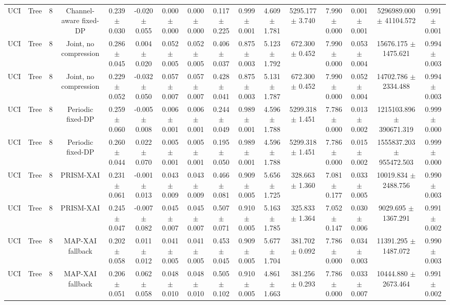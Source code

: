 \begin{tabular}{lccccccccccccccc}
UCI & Tree & 8 & Channel-aware fixed-DP & 0.239 $\pm$ 0.030 & -0.020 $\pm$ 0.055 & 0.000 $\pm$ 0.000 & 0.000 $\pm$ 0.000 & 0.117 $\pm$ 0.225 & 0.999 $\pm$ 0.001 & 4.609 $\pm$ 1.781 & 5295.177 $\pm$ 3.740 & 7.990 $\pm$ 0.000 & 0.001 $\pm$ 0.001 & 5296989.000 $\pm$ 41104.572 & 0.991 $\pm$ 0.001 \\
UCI & Tree & 8 & Joint, no compression & 0.286 $\pm$ 0.045 & 0.004 $\pm$ 0.020 & 0.052 $\pm$ 0.005 & 0.052 $\pm$ 0.005 & 0.406 $\pm$ 0.037 & 0.875 $\pm$ 0.003 & 5.123 $\pm$ 1.792 & 672.300 $\pm$ 0.452 & 7.990 $\pm$ 0.000 & 0.053 $\pm$ 0.004 & 15676.175 $\pm$ 1475.621 & 0.994 $\pm$ 0.003 \\
UCI & Tree & 8 & Joint, no compression & 0.229 $\pm$ 0.052 & -0.032 $\pm$ 0.050 & 0.057 $\pm$ 0.007 & 0.057 $\pm$ 0.007 & 0.428 $\pm$ 0.041 & 0.875 $\pm$ 0.003 & 5.131 $\pm$ 1.787 & 672.300 $\pm$ 0.452 & 7.990 $\pm$ 0.000 & 0.052 $\pm$ 0.004 & 14702.786 $\pm$ 2334.488 & 0.994 $\pm$ 0.003 \\
UCI & Tree & 8 & Periodic fixed-DP & 0.259 $\pm$ 0.060 & -0.005 $\pm$ 0.008 & 0.006 $\pm$ 0.001 & 0.006 $\pm$ 0.001 & 0.244 $\pm$ 0.049 & 0.989 $\pm$ 0.001 & 4.596 $\pm$ 1.788 & 5299.318 $\pm$ 1.451 & 7.786 $\pm$ 0.000 & 0.013 $\pm$ 0.002 & 1215103.896 $\pm$ 390671.319 & 0.999 $\pm$ 0.000 \\
UCI & Tree & 8 & Periodic fixed-DP & 0.260 $\pm$ 0.044 & 0.022 $\pm$ 0.070 & 0.005 $\pm$ 0.001 & 0.005 $\pm$ 0.001 & 0.195 $\pm$ 0.050 & 0.989 $\pm$ 0.001 & 4.596 $\pm$ 1.788 & 5299.318 $\pm$ 1.451 & 7.786 $\pm$ 0.000 & 0.015 $\pm$ 0.002 & 1555837.203 $\pm$ 955472.503 & 0.999 $\pm$ 0.000 \\
UCI & Tree & 8 & PRISM-XAI & 0.231 $\pm$ 0.061 & -0.001 $\pm$ 0.013 & 0.043 $\pm$ 0.009 & 0.043 $\pm$ 0.009 & 0.466 $\pm$ 0.081 & 0.909 $\pm$ 0.005 & 5.656 $\pm$ 1.725 & 328.663 $\pm$ 1.360 & 7.081 $\pm$ 0.177 & 0.033 $\pm$ 0.005 & 10019.834 $\pm$ 2488.756 & 0.990 $\pm$ 0.003 \\
UCI & Tree & 8 & PRISM-XAI & 0.245 $\pm$ 0.047 & -0.007 $\pm$ 0.082 & 0.045 $\pm$ 0.007 & 0.045 $\pm$ 0.007 & 0.507 $\pm$ 0.071 & 0.910 $\pm$ 0.005 & 5.163 $\pm$ 1.785 & 325.833 $\pm$ 1.364 & 7.052 $\pm$ 0.147 & 0.030 $\pm$ 0.006 & 9029.695 $\pm$ 1367.291 & 0.991 $\pm$ 0.002 \\
UCI & Tree & 8 & MAP-XAI fallback & 0.202 $\pm$ 0.058 & 0.011 $\pm$ 0.012 & 0.041 $\pm$ 0.005 & 0.041 $\pm$ 0.005 & 0.453 $\pm$ 0.045 & 0.909 $\pm$ 0.005 & 5.677 $\pm$ 1.704 & 381.702 $\pm$ 0.092 & 7.786 $\pm$ 0.000 & 0.034 $\pm$ 0.003 & 11391.295 $\pm$ 1487.072 & 0.990 $\pm$ 0.003 \\
UCI & Tree & 8 & MAP-XAI fallback & 0.206 $\pm$ 0.051 & 0.062 $\pm$ 0.058 & 0.048 $\pm$ 0.010 & 0.048 $\pm$ 0.010 & 0.505 $\pm$ 0.102 & 0.910 $\pm$ 0.005 & 4.861 $\pm$ 1.663 & 381.256 $\pm$ 0.293 & 7.786 $\pm$ 0.000 & 0.033 $\pm$ 0.007 & 10444.880 $\pm$ 2673.464 & 0.991 $\pm$ 0.002 \\
\bottomrule
\end{tabular}
